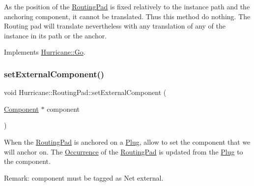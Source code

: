 As the position of the \mbox{\hyperlink{classHurricane_1_1RoutingPad}{Routing\+Pad}} is fixed relatively to the instance path and the anchoring component, it cannot be translated. Thus this method do nothing. The Routing pad will translate nevertheless with any translation of any of the instance in it\textquotesingle{}s path or the anchor. 

Implements \mbox{\hyperlink{classHurricane_1_1Go_a54c4351dbbf4045e1aa89f06bb893402}{Hurricane\+::\+Go}}.

\mbox{\label{classHurricane_1_1RoutingPad_a9f448ad4f05f6995edc4a5ab50501586}} 
\subsubsection{\texorpdfstring{set\+External\+Component()}{setExternalComponent()}}
{\footnotesize\ttfamily void Hurricane\+::\+Routing\+Pad\+::set\+External\+Component (\begin{DoxyParamCaption}\item[{\mbox{\hyperlink{classHurricane_1_1Component}{Component}} $\ast$}]{component }\end{DoxyParamCaption})}

When the \mbox{\hyperlink{classHurricane_1_1RoutingPad}{Routing\+Pad}} is anchored on a \mbox{\hyperlink{classHurricane_1_1Plug}{Plug}}, allow to set the {\ttfamily component} that we will anchor on. The \mbox{\hyperlink{classHurricane_1_1Occurrence}{Occurrence}} of the \mbox{\hyperlink{classHurricane_1_1RoutingPad}{Routing\+Pad}} is updated from the \mbox{\hyperlink{classHurricane_1_1Plug}{Plug}} to the {\ttfamily component}.

\begin{DoxyParagraph}{Remark\+: {\ttfamily component} must be tagged as Net external. }

\end{DoxyParagraph}
\mbox{\label{classHurricane_1_1RoutingPad_a410992ef75c40f9a898c36f39a7d1a1a}} 
